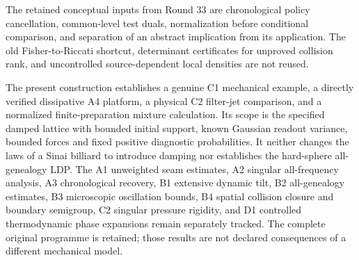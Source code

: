 The retained conceptual inputs from Round 33 are chronological policy cancellation, common-level test duals, normalization before conditional comparison, and separation of an abstract implication from its application. The old Fisher-to-Riccati shortcut, determinant certificates for unproved collision rank, and uncontrolled source-dependent local densities are not reused.

The present construction establishes a genuine C1 mechanical example, a directly verified dissipative A4 platform, a physical C2 filter-jet comparison, and a normalized finite-preparation mixture calculation. Its scope is the specified damped lattice with bounded initial support, known Gaussian readout variance, bounded forces and fixed positive diagnostic probabilities. It neither changes the laws of a Sinai billiard to introduce damping nor establishes the hard-sphere all-genealogy LDP. The A1 unweighted seam estimates, A2 singular all-frequency analysis, A3 chronological recovery, B1 extensive dynamic tilt, B2 all-genealogy estimates, B3 microscopic oscillation bounds, B4 spatial collision closure and boundary semigroup, C2 singular pressure rigidity, and D1 controlled thermodynamic phase expansions remain separately tracked. The complete original programme is retained; those results are not declared consequences of a different mechanical model.

